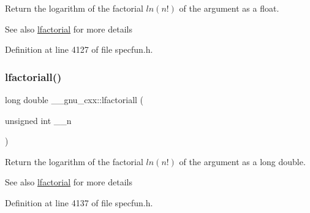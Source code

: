 Return the logarithm of the factorial $ ln(n!) $ of the argument as a {\ttfamily float}.

\begin{DoxySeeAlso}{See also}
\hyperlink{group__gnu__math__spec__func_gab256f8d7b77b9a8fefafca21827166eb}{lfactorial} for more details 
\end{DoxySeeAlso}


Definition at line 4127 of file specfun.\+h.

\mbox{\label{group__gnu__math__spec__func_ga3a0c196f34916dc68c29c89f26cbe1ee}} 
\subsubsection{\texorpdfstring{lfactoriall()}{lfactoriall()}}
{\footnotesize\ttfamily long double \+\_\+\+\_\+gnu\+\_\+cxx\+::lfactoriall (\begin{DoxyParamCaption}\item[{unsigned int}]{\+\_\+\+\_\+n }\end{DoxyParamCaption})\hspace{0.3cm}{\ttfamily [inline]}}

Return the logarithm of the factorial $ ln(n!) $ of the argument as a {\ttfamily long double}.

\begin{DoxySeeAlso}{See also}
\hyperlink{group__gnu__math__spec__func_gab256f8d7b77b9a8fefafca21827166eb}{lfactorial} for more details 
\end{DoxySeeAlso}


Definition at line 4137 of file specfun.\+h.

\mbox{\label{group__gnu__math__spec__func_ga2032c10640d5010666d60d9faec86c32}} 

